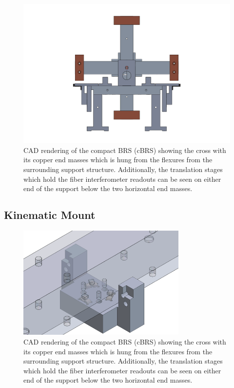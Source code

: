 \documentclass [12pt, proquest]{uwthesis}[2019]
\begin{document}
\begin{figure}[!h]
\begin{center}
 \includegraphics[width=\textwidth]{cBRSFront.png}
 
\caption{CAD rendering of the compact BRS (cBRS) showing the cross with its copper end masses which is hung from the flexures from the surrounding support structure. Additionally, the translation stages which hold the fiber interferometer readouts can be seen on either end of the support below the two horizontal end masses.}
\label{cBRS}
\end{center}
\end{figure}

\subsection{Kinematic Mount}

\begin{figure}[!h]
\begin{center}
\includegraphics[width=0.75\textwidth]{cBRSKMount.png}
\end{center}
\caption{CAD rendering of the compact BRS (cBRS) showing the cross with its copper end masses which is hung from the flexures from the surrounding support structure. Additionally, the translation stages which hold the fiber interferometer readouts can be seen on either end of the support below the two horizontal end masses.}
\end{figure}
\end{document}
